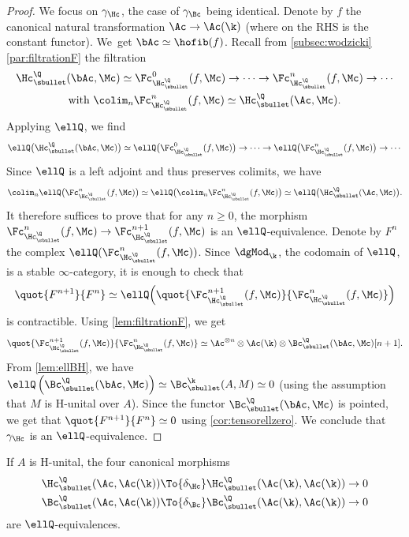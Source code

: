 \begin{proof}
We focus on $\gamma_\Hc$, the case of $\gamma_\Bc$ being identical.
Denote by $f$ the canonical natural transformation $\Ac \to \Ac(\k)$ (where on the RHS is the constant functor). We~get $\bAc \simeq \hofib(f)$.
Recall from \autoref{subsec:wodzicki}\,\ref{par:filtrationF} the filtration
\begin{multline*}
\Hc_\sbullet^\Q(\bAc,\Mc) \simeq \Fc_{\Hc_\sbullet^\Q}^0(f,\Mc) \to \cdots \to \Fc_{\Hc_\sbullet^\Q}^n(f,\Mc) \to \cdots
\\
\text{with }\colim_n \Fc_{\Hc_\sbullet^\Q}^n(f,\Mc) \simeq \Hc_\sbullet^\Q(\Ac, \Mc).
\end{multline*}
Applying $\ellQ$, we find
\[
\ellQ\bigl(\Hc_\sbullet^\Q(\bAc,\Mc)\bigr) \simeq \ellQ\bigl(\Fc_{\Hc_\sbullet^\Q}^0(f,\Mc)\bigr) \to \cdots \to \ellQ\bigl(\Fc_{\Hc_\sbullet^\Q}^n(f,\Mc)\bigr) \to \cdots
\]
Since $\ellQ$ is a left adjoint and thus preserves colimits, we have
\[
\colim_n \ellQ\bigl(\Fc_{\Hc_\sbullet^\Q}^n(f,\Mc)\bigr) \simeq \ellQ\bigl(\colim_n \Fc_{\Hc_\sbullet^\Q}^n(f,\Mc)\bigr) \simeq \ellQ\bigl(\Hc_\sbullet^\Q(\Ac, \Mc)\bigr).
\]
It therefore suffices to prove that for any $n \geq 0$, the morphism $\Fc_{\Hc_\sbullet^\Q}^n(f,\Mc) \to \Fc_{\Hc_\sbullet^\Q}^{n+1}(f,\Mc)$ is an $\ellQ$-equivalence. Denote by $F^n$ the complex $\ellQ(\Fc_{\Hc_\sbullet^\Q}^n(f,\Mc))$.
Since $\dgMod_\k$, the codomain of $\ellQ$, is a stable $\infty$-category, it is enough to check that
\[
\quot{F^{n+1}}{F^n} \simeq \ellQ\Bigl( \quot{\Fc_{\Hc_\sbullet^\Q}^{n+1}(f,\Mc)}{\Fc_{\Hc_\sbullet^\Q}^n(f,\Mc)} \Bigr)
\]
is contractible.
Using \autoref{lem:filtrationF}, we get
\[
\quot{\Fc_{\Hc_\sbullet^\Q}^{n+1}(f,\Mc)}{\Fc_{\Hc_\sbullet^\Q}^n(f,\Mc)} \simeq \Ac^{\otimes n} \otimes \Ac(\k) \otimes \Bc_\sbullet^\Q(\bAc, \Mc)[n+1].
\]
From \autoref{lem:ellBH}, we have $\ellQ\left(\Bc_\sbullet^\Q(\bAc, \Mc) \right) \simeq \Bc_\sbullet^\k(A,M) \simeq 0$ (using the assumption that $M$ is H-unital over $A$).
Since the functor $\Bc_\sbullet^\Q(\bAc, \Mc)$ is pointed, we get that $\quot{F^{n+1}}{F^n} \simeq 0$ using \autoref{cor:tensorellzero}. We conclude that $\gamma_\Hc$ is an $\ellQ$-equivalence.
\end{proof}

\begin{lem}\label{lem:deltaeqs}
If $A$ is H-unital, the four canonical morphisms
\begin{align*}
\Hc_\sbullet^\Q(\Ac,\Ac(\k)) &\To{\delta_\Hc} \Hc_\sbullet^\Q(\Ac(\k),\Ac(\k)) \to 0\\
\Bc_\sbullet^\Q(\Ac,\Ac(\k)) &\To{\delta_\Bc} \Bc_\sbullet^\Q(\Ac(\k),\Ac(\k)) \to 0
\end{align*}
are $\ellQ$-equivalences.
\end{lem}

